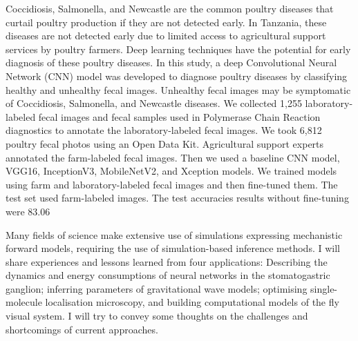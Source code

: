 \documentclass[a4paper,UKenglish]{dagrep-v2018}
\begin{document}
Coccidiosis, Salmonella, and Newcastle are the common poultry diseases that curtail poultry production if they are not detected early. In Tanzania, these diseases are not detected early due to limited access to agricultural support services by poultry farmers. Deep learning techniques have the potential for early diagnosis of these poultry diseases. In this study, a deep Convolutional Neural Network (CNN) model was developed to diagnose poultry diseases by classifying healthy and unhealthy fecal images. Unhealthy fecal images may be symptomatic of Coccidiosis, Salmonella, and Newcastle diseases. We collected 1,255 laboratory-labeled fecal images and fecal samples used in Polymerase Chain Reaction diagnostics to annotate the laboratory-labeled fecal images. We took 6,812 poultry fecal photos using an Open Data Kit. Agricultural support experts annotated the farm-labeled fecal images. Then we used a baseline CNN model, VGG16, InceptionV3, MobileNetV2, and Xception models. We trained models using farm and laboratory-labeled fecal images and then fine-tuned them. The test set used farm-labeled images. The test accuracies results without fine-tuning were 83.06%

\license

Many fields of science make extensive use of simulations expressing mechanistic forward models, requiring the use of simulation-based inference methods. I will share experiences and lessons learned from four applications: Describing the dynamics and energy consumptions of neural networks in the stomatogastric ganglion; inferring parameters of gravitational wave models; optimising single-molecule localisation microscopy, and building computational models of the fly visual system. I will try to convey some thoughts on the challenges and shortcomings of current approaches.
\end{document}
